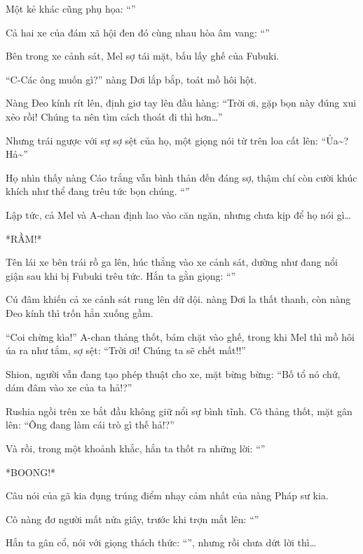 \documentclass[../main.tex]{subfiles}
\begin{document}
Một kẻ khác cũng phụ họa: ``''

Cả hai xe của đám xã hội đen đó cùng nhau hòa âm vang: ``''

Bên trong xe cảnh sát, Mel sợ tái mặt, bấu lấy ghế của Fubuki.

``C-Các ông muốn gì?'' nàng Dơi lắp bắp, toát mồ hôi hột.

Nàng Đeo kính rít lên, định giơ tay lên đầu hàng: ``Trời ơi, gặp bọn này đúng xui xẻo rồi! Chúng ta nên tìm cách thoát đi thì hơn\dots''

Nhưng trái ngược với sự sợ sệt của họ, một giọng nói từ trên loa cất lên: ``Ủa\~{}? Hả\~{}''

Họ nhìn thấy nàng Cáo trắng vẫn bình thản đến đáng sợ, thậm chí còn cười khúc khích như thể đang trêu tức bọn chúng. ``''

Lập tức, cả Mel và A-chan định lao vào căn ngăn, nhưng chưa kịp để họ nói gì\dots

*RẦM!*

Tên lái xe bên trái rồ ga lên, húc thẳng vào xe cảnh sát, dường như đang nổi giận sau khi bị Fubuki trêu tức. Hắn ta gằn giọng: ``''

Cú đâm khiến cả xe cảnh sát rung lên dữ dội. nàng Dơi la thất thanh, còn nàng Đeo kính thì trốn hẳn xuống gầm.

``Coi chừng kìa!'' A-chan thảng thốt, bám chặt vào ghế, trong khi Mel thì mồ hôi úa ra như tắm, sợ sệt: ``Trời ơi! Chúng ta sẽ chết mất!!''

Shion, người vẫn đang tạo phép thuật cho xe, mặt bừng bừng: ``Bố tổ nó chứ, dám đâm vào xe của ta hả!?''

Rushia ngồi trên xe bắt đầu không giữ nổi sự bình tĩnh. Cô thảng thốt, mặt gân lên: ``Ông đang làm cái trò gì thế hả!?''

Và rồi, trong một khoảnh khắc, hắn ta thốt ra những lời: ``''

*BOONG!*

Câu nói của gã kia đụng trúng điểm nhạy cảm nhất của nàng Pháp sư kia.

Cô nàng đơ người mất nửa giây, trước khi trợn mắt lên: ``\textbf{}''

Hắn ta gân cổ, nói với giọng thách thức: ``'', nhưng rồi chưa dứt lời thì\dots
\end{document}
